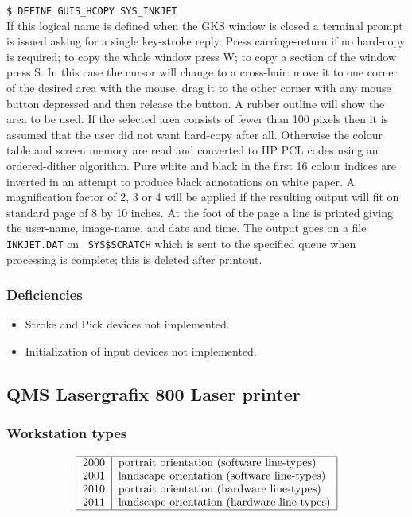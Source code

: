 {\tt \$ DEFINE GUIS\_HCOPY SYS\_INKJET}
\\
If this logical name is defined when the GKS window is closed a terminal
prompt is issued asking for a single key-stroke reply.  Press
carriage-return if no hard-copy is required; to copy the whole window
press W; to copy a section of the window press S.  In this case the
cursor will change to a cross-hair: move it to one corner of the desired
area with the mouse, drag it to the other corner with any mouse button
depressed and then release the button.  A rubber outline will show the
area to be used. If the selected area consists of fewer than 100 pixels
then it is assumed that the user did not want hard-copy after all. 
Otherwise the colour table and screen memory are read and converted to
HP PCL codes using an ordered-dither algorithm.
Pure white and black in the first 16 colour
indices are inverted in an attempt to produce black annotations on white
paper. A magnification factor of 2, 3 or 4 will be applied if the
resulting output will fit on standard page of 8 by 10 inches. At the
foot of the page a line is printed giving the user-name, image-name, and
date and time. The output goes on a file {\tt INKJET.DAT} on {\tt
SYS\$SCRATCH} which is sent to the specified queue when processing is
complete; this is deleted after printout. 

\subsubsection{Deficiencies}
\begin{itemize}
\item Stroke and Pick devices not implemented.
\item Initialization of input devices not implemented.
\end{itemize}

\subsection{QMS Lasergrafix 800 Laser printer}
\label{qms}
\subsubsection{Workstation types}
\[\begin{tabular}{|l|l|}\hline
2000 &portrait orientation  (software line-types)\\
2001 &landscape orientation (software line-types)\\
2010 &portrait orientation  (hardware line-types)\\
2011 &landscape orientation (hardware line-types)\\\hline
\end{tabular}\]

